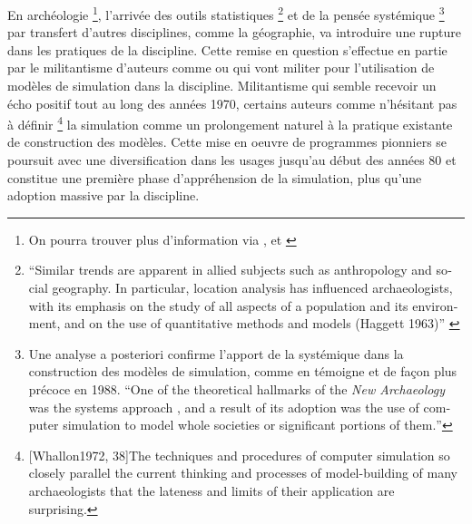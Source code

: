 En archéologie \footnote{On pourra trouver plus d'information via \autocite{Kohler2011}, et \autocite{Lake2013}}, l'arrivée des outils statistiques \footnote{\foreignquote{english}{Similar trends are apparent in allied subjects such as anthropology and social geography. In particular, location analysis has influenced archaeologists, with its emphasis on the study of all aspects of a population and its environment, and on the use of quantitative methods and models (Haggett 1963)} \autocite{Doran1970}} et de la pensée systémique \autocites{Clarke1968, Flannery1968, Binford1968} \footnote{Une analyse a posteriori confirme l'apport de la systémique dans la construction des modèles de simulation, comme en témoigne \textcite[5]{Lake2013} et de façon plus précoce \textcite{Aldenderfer1998} en 1988. \foreignquote{english}{One of the theoretical hallmarks of the \textit{New Archaeology} was the systems approach \autocite{Aldenderfer1991}, and a result of its adoption was the use of computer simulation to model whole societies or significant portions of them.}} par transfert d'autres disciplines, comme la géographie, va introduire une rupture dans les pratiques de la discipline. Cette remise en question s'effectue en partie par le militantisme d'auteurs comme \textcite{Clarke1968} ou \textcite{Doran1970} qui vont militer pour l'utilisation de modèles de simulation dans la discipline. Militantisme qui semble recevoir un écho positif tout au long des années 1970, certains auteurs comme \textcite[38]{Whallon1972} n'hésitant pas à définir \footnote{ [Whallon1972, 38]{The techniques and procedures of computer simulation so closely parallel the current thinking and processes of model-building of many archaeologists that the lateness and limits of their application are surprising.}} la simulation comme un prolongement naturel à la pratique existante de construction des modèles.  Cette mise en oeuvre de programmes pionniers se poursuit avec une diversification dans les usages jusqu'au début des années 80 et constitue une première phase d'appréhension de la simulation, plus qu'une adoption massive par la discipline. \autocite{Lake2013}



